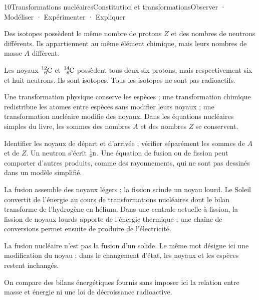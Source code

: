 \begin{ouverture}[radioactivite]{10}{Transformations nucléaires}{Constitution et transformations}{Observer · Modéliser · Expérimenter · Expliquer}
\end{ouverture}
\essentiel
{}
Des isotopes possèdent le même nombre de protons $Z$ et des nombres de neutrons différents. Ils appartiennent au même élément chimique, mais leurs nombres de masse $A$ diffèrent.
\begin{exemple}Les noyaux $\ce{^{12}_{6}C}$ et $\ce{^{14}_{6}C}$ possèdent tous deux six protons, mais respectivement six et huit neutrons. Ils sont isotopes. Tous les isotopes ne sont pas radioactifs.\end{exemple}
Une transformation physique conserve les espèces ; une transformation chimique redistribue les atomes entre espèces sans modifier leurs noyaux ; une transformation nucléaire modifie des noyaux. Dans les équations nucléaires simples du livre, les sommes des nombres $A$ et des nombres $Z$ se conservent.
\begin{savoirfaire}Identifier les noyaux de départ et d'arrivée ; vérifier séparément les sommes de $A$ et de $Z$. Un neutron s'écrit $\ce{^{1}_{0}n}$. Une équation de fusion ou de fission peut comporter d'autres produits, comme des rayonnements, qui ne sont pas dessinés dans un modèle simplifié.\end{savoirfaire}
La fusion assemble des noyaux légers ; la fission scinde un noyau lourd. Le Soleil convertit de l'énergie au cours de transformations nucléaires dont le bilan transforme de l'hydrogène en hélium. Dans une centrale actuelle à fission, la fission de noyaux lourds apporte de l'énergie thermique ; une chaîne de conversions permet ensuite de produire de l'électricité.
\begin{attention}La fusion nucléaire n'est pas la fusion d'un solide. Le même mot désigne ici une modification du noyau ; dans le changement d'état, les noyaux et les espèces restent inchangés.\end{attention}
On compare des bilans énergétiques fournis sans imposer ici la relation entre masse et énergie ni une loi de décroissance radioactive.
